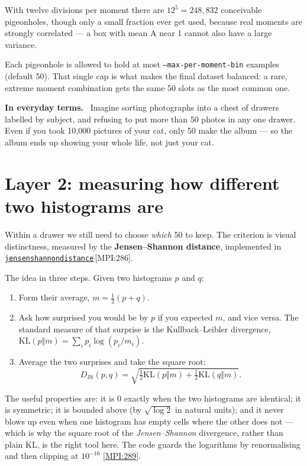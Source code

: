\documentclass[11pt,a4paper]{report}
\newcommand{\srcbase}{vscode://file/Users/syellapa/Documents/Research/2026/ANSYS/Multi-ScalarPDF}
\newcommand{\srctag}[1]{{\footnotesize\textcolor{TagGray}{[#1]}}}
\newcommand{\Mpi}[2]{\href{\srcbase/EnsightPDFHybridDatasetMPI.py:#1}{\texttt{#2}}\,\srctag{MPI:#1}}
\newcommand{\MpiL}[1]{\href{\srcbase/EnsightPDFHybridDatasetMPI.py:#1}{\srctag{MPI:#1}}}
\newcommand{\code}[1]{\texttt{#1}}
\newcommand{\term}[1]{\textbf{#1}}
\renewcommand{\_}{\origtextunderscore\allowbreak}
\newlength{\calloutwidth}
\newcommand{\calloutOpen}{%
  \par\medskip\noindent
  \setlength{\calloutwidth}{\dimexpr\linewidth-2\fboxsep\relax}%
  \begin{lrbox}{\calloutbox}\begin{minipage}{\calloutwidth}}
\newcommand{\calloutClose}[1]{%
  \end{minipage}\end{lrbox}\colorbox{#1}{\usebox{\calloutbox}}\par\medskip}
\newenvironment{analogy}
  {\calloutOpen\textbf{In everyday terms.}\ }
  {\calloutClose{BoxBG}}
\begin{document}
With twelve divisions per moment there are $12^5 = 248{,}832$ conceivable pigeonholes, though
only a small fraction ever get used, because real moments are strongly correlated --- a box
with mean A near 1 cannot also have a large variance.

Each pigeonhole is allowed to hold at most \code{--max-per-moment-bin} examples (default 50).
That single cap is what makes the final dataset balanced: a rare, extreme moment combination
gets the same 50 slots as the most common one.

\begin{analogy}
Imagine sorting photographs into a chest of drawers labelled by subject, and refusing to put
more than 50 photos in any one drawer. Even if you took 10{,}000 pictures of your cat, only
50 make the album --- so the album ends up showing your whole life, not just your cat.
\end{analogy}

\section{Layer 2: measuring how different two histograms are}

Within a drawer we still need to choose \emph{which} 50 to keep. The criterion is visual
distinctness, measured by the \term{Jensen--Shannon distance}, implemented in
\Mpi{286}{jensen\_shannon\_distance}.

The idea in three steps. Given two histograms $p$ and $q$:
\begin{enumerate}
  \item Form their average, $m = \tfrac{1}{2}(p + q)$.
  \item Ask how surprised you would be by $p$ if you expected $m$, and vice versa. The
        standard measure of that surprise is the Kullback--Leibler divergence,
        $\mathrm{KL}(p \Vert m) = \sum_i p_i \log(p_i / m_i)$.
  \item Average the two surprises and take the square root:
        \[
          D_{\mathrm{JS}}(p, q) = \sqrt{\tfrac{1}{2}\mathrm{KL}(p \Vert m)
                                      + \tfrac{1}{2}\mathrm{KL}(q \Vert m)} .
        \]
\end{enumerate}

The useful properties are: it is 0 exactly when the two histograms are identical; it is
symmetric; it is bounded above (by $\sqrt{\log 2}$ in natural units); and it never blows up
even when one histogram has empty cells where the other does not --- which is why the square
root of the \emph{Jensen--Shannon} divergence, rather than plain KL, is the right tool here.
The code guards the logarithms by renormalising and then clipping at $10^{-16}$ \MpiL{289}.
\end{document}
